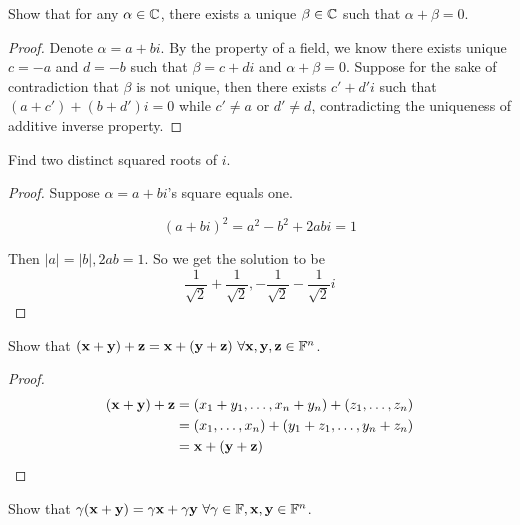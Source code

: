 \documentclass{extarticle}
\begin{document}
\begin{problem}{5}
    Show that for any \(\alpha \in \mathbb{C}\), there exists a unique \(\beta \in \mathbb{C}\) such
    that \(\alpha + \beta = 0\). 
\end{problem}

\begin{proof}
Denote \(\alpha = a + bi\). By the property of a field, we know there exists unique 
\(c = -a\) and \(d = -b\) such that \(\beta = c + di\) and \(\alpha + \beta=0\). Suppose
for the sake of contradiction that \(\beta\) is not unique, then there exists 
\(c' + d'i\) such that \((a + c') + (b + d')i = 0\) while \(c' \neq a\) or \(d' \neq d\),
contradicting the uniqueness of additive inverse property.
\end{proof}


\begin{problem}{8}
    Find two distinct squared roots of \(i\). 
\end{problem}

\begin{proof}
Suppose \(\alpha = a + bi\)'s square equals one. 

\begin{equation*}
    (a + bi)^2 = a^2 - b^2 + 2abi = 1
\end{equation*}

Then \(|a| = |b|, 2ab = 1 \). So we get the solution to be 
\[\frac{1}{\sqrt{2}} + \frac{1}{\sqrt{2}}, -\frac{1}{\sqrt{2}} - \frac{1}{\sqrt{2}}i\] 
\end{proof}


\begin{problem}{10}
    Show that \((\mathbf{x} + \mathbf{y}) + \mathbf{z} = \mathbf{x} + (\mathbf{y} + \mathbf{z}) \ \forall  \mathbf{x}, \mathbf{y}, \mathbf{z} \in \mathbb{F}^n\). 
\end{problem}

\begin{proof}
\begin{align*}
    (\mathbf{x} + \mathbf{y}) + \mathbf{z} 
    &= (x_1 + y_1, \ldots, x_n + y_n) + (z_1 , \ldots, z_n) \\ 
    &= (x_1, \ldots, x_n) + (y_1 + z_1, \ldots, y_n + z_n) \\ 
    &= \mathbf{x} + (\mathbf{y} + \mathbf{z})
\end{align*}
\end{proof}

\begin{problem}{14}
    Show that \(\gamma(\mathbf{x} + \mathbf{y}) = \gamma \mathbf{x} + \gamma \mathbf{y} \ \forall \gamma \in \mathbb{F}, \mathbf{x}, \mathbf{y} \in \mathbb{F}^n\).
\end{problem}
\end{document}
